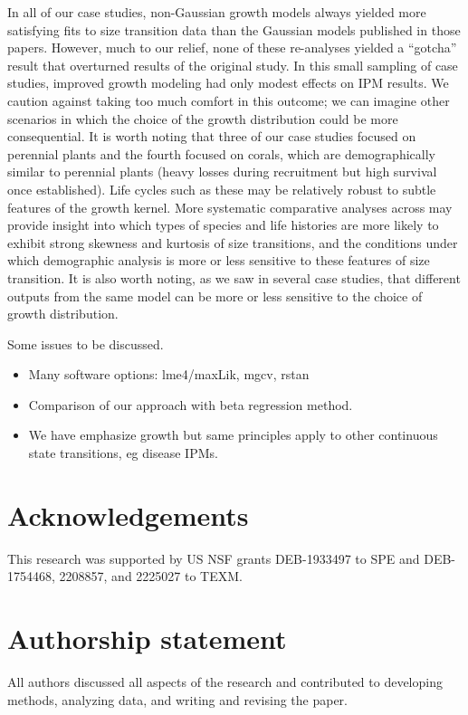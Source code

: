 \documentclass[12pt]{article}
\begin{document}
In all of our case studies, non-Gaussian growth models always yielded more satisfying fits to size transition data than the Gaussian models published in those papers. 
However, much to our relief, none of these re-analyses yielded a ``gotcha'' result that overturned results of the original study. 
In this small sampling of case studies, improved growth modeling had only modest effects on IPM results. 
We caution against taking too much comfort in this outcome; we can imagine other scenarios in which the choice of the growth distribution could be more consequential. 
It is worth noting that three of our case studies focused on perennial plants and the fourth focused on corals, which are demographically similar to perennial plants (heavy losses during recruitment but high survival once established). 
Life cycles such as these may be relatively robust to subtle features of the growth kernel. 
More systematic comparative analyses across may provide insight into which types of species and life histories are more likely to exhibit strong skewness and kurtosis of size transitions, and the conditions under which demographic analysis is more or less sensitive to these features of size transition. 
It is also worth noting, as we saw in several case studies, that different outputs from the same model can be more or less sensitive to the choice of growth distribution. 


Some issues to be discussed.
\begin{itemize}
\item{Many software options: lme4/maxLik, mgcv, rstan}
\item{Comparison of our approach with beta regression method.}
\item{We have emphasize growth but same principles apply to other continuous state transitions, eg disease IPMs.}


\end{itemize}

\section*{Acknowledgements} 
This research was supported by US NSF grants DEB-1933497 to SPE and DEB-1754468, 2208857, and 2225027 to TEXM. 

\section{Authorship statement} 
All authors discussed all aspects of the research and contributed to developing methods, analyzing data, and writing and revising the paper.  
\end{document}
